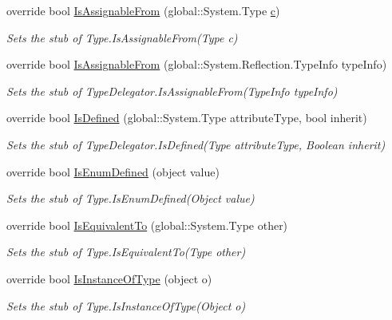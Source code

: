 \begin{DoxyCompactItemize}
override bool \hyperlink{class_system_1_1_reflection_1_1_fakes_1_1_stub_type_delegator_a01463c50c5d072b25dff42bf9d14a9b2}{Is\-Assignable\-From} (global\-::\-System.\-Type \hyperlink{bootstrap_8min_8js_abce695e0af988ece0826d9ad59b8160d}{c})
\begin{DoxyCompactList}\small\item\em Sets the stub of Type.\-Is\-Assignable\-From(\-Type c)\end{DoxyCompactList}\item 
override bool \hyperlink{class_system_1_1_reflection_1_1_fakes_1_1_stub_type_delegator_a1bcec9227701ac14d49f4b7c8d69617d}{Is\-Assignable\-From} (global\-::\-System.\-Reflection.\-Type\-Info type\-Info)
\begin{DoxyCompactList}\small\item\em Sets the stub of Type\-Delegator.\-Is\-Assignable\-From(\-Type\-Info type\-Info)\end{DoxyCompactList}\item 
override bool \hyperlink{class_system_1_1_reflection_1_1_fakes_1_1_stub_type_delegator_ab7e0c6b7029c35e8922f0413c91a2eb0}{Is\-Defined} (global\-::\-System.\-Type attribute\-Type, bool inherit)
\begin{DoxyCompactList}\small\item\em Sets the stub of Type\-Delegator.\-Is\-Defined(\-Type attribute\-Type, Boolean inherit)\end{DoxyCompactList}\item 
override bool \hyperlink{class_system_1_1_reflection_1_1_fakes_1_1_stub_type_delegator_ae1fc9b5747a057ca6fb7a6a11c7e42d1}{Is\-Enum\-Defined} (object value)
\begin{DoxyCompactList}\small\item\em Sets the stub of Type.\-Is\-Enum\-Defined(\-Object value)\end{DoxyCompactList}\item 
override bool \hyperlink{class_system_1_1_reflection_1_1_fakes_1_1_stub_type_delegator_a21eec31e354d604569267cecc07647fa}{Is\-Equivalent\-To} (global\-::\-System.\-Type other)
\begin{DoxyCompactList}\small\item\em Sets the stub of Type.\-Is\-Equivalent\-To(\-Type other)\end{DoxyCompactList}\item 
override bool \hyperlink{class_system_1_1_reflection_1_1_fakes_1_1_stub_type_delegator_a79bb60933788c47d622e3cf97bab6b96}{Is\-Instance\-Of\-Type} (object o)
\begin{DoxyCompactList}\small\item\em Sets the stub of Type.\-Is\-Instance\-Of\-Type(\-Object o)\end{DoxyCompactList}\item 

\end{DoxyCompactItemize}
